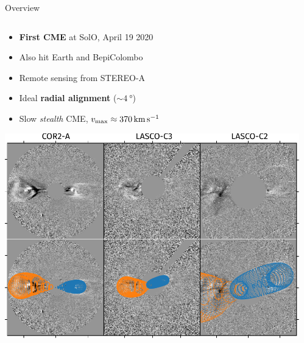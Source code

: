 \documentclass[10pt,aspectratio=169,usenames,dvipsnames]{beamer}
\newcommand{\maxt}{\ensuremath\text{max}}
\begin{document}
\begin{frame}{Overview}
    \begin{columns}
        \begin{column}{0.4\textwidth}
            \begin{itemize}
                \item \textbf{First CME} at SolO, April 19 2020
                \item Also hit Earth and BepiColombo
                \item Remote sensing from STEREO-A
                \item Ideal \textbf{radial alignment} ($\sim\SI{4}{\degree}$)
                \item Slow \textit{stealth} CME, $v_\maxt \approx \SI{370}{\kilo\meter\per\second}$
            \end{itemize}
            \vspace{2mm}
            \includegraphics[width=\textwidth]{plots/gcs_reconstruction.pdf}
        \end{column}
        \begin{column}{0.5\textwidth}
        	\vskip2mm

\end{column}
\end{columns}
\end{frame}
\end{document}
